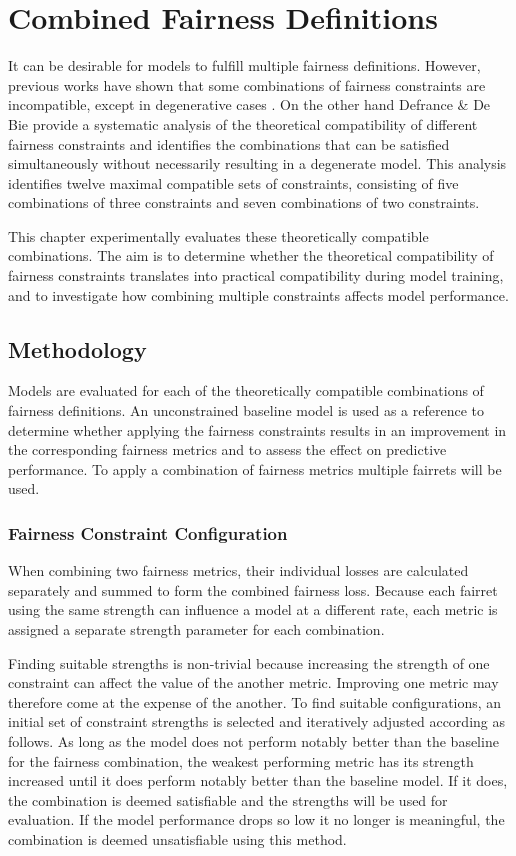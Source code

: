 \chapter{Combined Fairness Definitions}
It can be desirable for models to fulfill multiple fairness definitions. However, previous works have shown that some combinations of fairness constraints are incompatible, except in degenerative cases \cite{fairness_incompatibility}. On the other hand Defrance \& De Bie \cite{max_combinations} provide a systematic analysis of the theoretical compatibility of different fairness constraints and identifies the combinations that can be satisfied simultaneously without necessarily resulting in a degenerate model. This analysis identifies twelve maximal compatible sets of constraints, consisting of five combinations of three constraints and seven combinations of two constraints. 

This chapter experimentally evaluates these theoretically compatible combinations. The aim is to determine whether the theoretical compatibility of fairness constraints translates into practical compatibility during model training, and to investigate how combining multiple constraints affects model performance.

\section{Methodology}
Models are evaluated for each of the theoretically compatible combinations of fairness definitions. An unconstrained baseline model is used as a reference to determine whether applying the fairness constraints results in an improvement in the corresponding fairness metrics and to assess the effect on predictive performance. To apply a combination of fairness metrics multiple fairrets will be used.

\subsection{Fairness Constraint Configuration}
When combining two fairness metrics, their individual losses are calculated separately and summed to form the combined fairness loss. Because each fairret using the same strength can influence a model at a different rate, each metric is assigned a separate strength parameter for each combination.

Finding suitable strengths is non-trivial because increasing the strength of one constraint can affect the value of the another metric. Improving one metric may therefore come at the expense of the another. To find suitable configurations, an initial set of constraint strengths is selected and iteratively adjusted according as follows.
As long as the model does not perform notably better than the baseline for the fairness combination, the weakest performing metric has its strength increased until it does perform notably better than the baseline model. If it does, the combination is deemed satisfiable and the strengths will be used for evaluation. If the model performance drops so low it no longer is meaningful, the combination is deemed unsatisfiable using this method.

